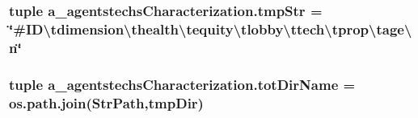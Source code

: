 \hypertarget{namespacea__agentstechs_characterization_afb29d4e5f94938bd1ef3c634c6207bd7}{
\subsubsection[{tmp\-Str}]{\setlength{\rightskip}{0pt plus 5cm}tuple a\-\_\-agentstechs\-Characterization.\-tmp\-Str = \char`\"{}\#I\-D\textbackslash{}tdimension\textbackslash{}thealth\textbackslash{}tequity\textbackslash{}tlobby\textbackslash{}ttech\textbackslash{}tprop\textbackslash{}tage\textbackslash{}n\char`\"{}}}\label{namespacea__agentstechs_characterization_afb29d4e5f94938bd1ef3c634c6207bd7}
\hypertarget{namespacea__agentstechs_characterization_aef56518a9f18115f3a3a8f71b947178e}{
\subsubsection[{tot\-Dir\-Name}]{\setlength{\rightskip}{0pt plus 5cm}tuple a\-\_\-agentstechs\-Characterization.\-tot\-Dir\-Name = os.\-path.\-join({\bf Str\-Path},tmp\-Dir)}}\label{namespacea__agentstechs_characterization_aef56518a9f18115f3a3a8f71b947178e}
